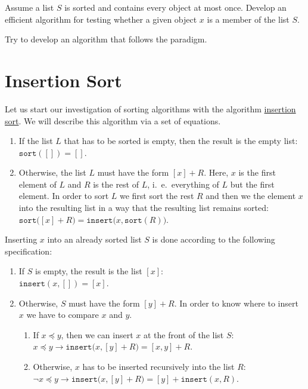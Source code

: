 \exercise
Assume a list $S$ is sorted and contains every object at most once.  Develop an efficient
algorithm for testing whether a given object $x$ is a member of the list $S$.

\hint Try to develop an algorithm that follows the 
paradigm. 
\eoxs

\section{Insertion Sort \label{sec:insertionSort}}
Let us start our investigation of sorting algorithms with the algorithm
\href{http://en.wikipedia.org/wiki/Insertion_sort}{insertion sort}.
We will describe this algorithm via a set of equations.
\begin{enumerate}
\item If the list $L$ that has to be sorted is empty, then the result is the empty list: 
      \\[0.2cm]
      \hspace*{1.3cm}
      $\mathtt{sort}([]) = []$.
\item Otherwise, the list $L$ must have the form $[x] + R$. Here, $x$ is the first element of $L$
      and $R$ is the rest of $L$, i.~e.~everything of $L$ but the first element.  In order to sort
      $L$ we first sort the rest $R$ and then we  the element $x$ into the resulting list in a
      way that the resulting list remains sorted:
      \\[0.2cm]
      \hspace*{1.3cm} $\mathtt{sort}\bigl([x] + R\bigr) = \mathtt{insert}\bigl(x, \mathtt{sort}(R)\bigr)$.
\end{enumerate}
Inserting $x$ into an already sorted list $S$ is done according to the following specification:
\begin{enumerate}
\item If $S$ is empty, the result is the list $[x]$: \\[0.2cm]
      \hspace*{1.3cm}
      $\mathtt{insert}(x,[]) = [x]$.
\item Otherwise, $S$ must have the form $[y] + R$.  In order to know where to insert $x$ we have to
      compare $x$ and $y$.
      \begin{enumerate}
      \item If $x \preceq y$, then we can insert $x$ at the front of the list $S$: \\[0.2cm]
            \hspace*{1.3cm}
            $x \preceq y \rightarrow \mathtt{insert}\bigl(x, [y] + R\bigr) = [x,y] + R$. 
      \item Otherwise, $x$ has to be inserted recursively into the list $R$: \\[0.2cm]
            \hspace*{1.3cm}
            $\neg x \preceq y \rightarrow \mathtt{insert}\bigl(x, [y] + R\bigr) = [y] + \mathtt{insert}(x,R)$. 
      \end{enumerate}
\end{enumerate}

